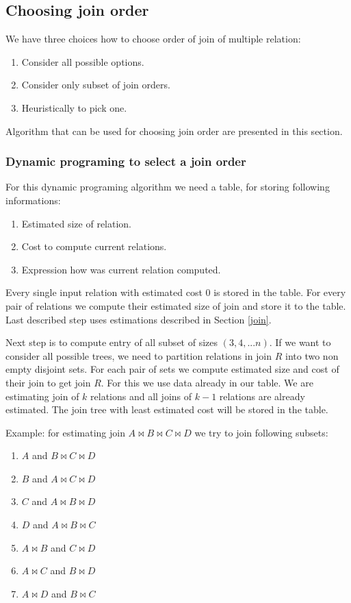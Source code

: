 \subsection{Choosing join order}
\label{joinOrder}
 We have three choices how to choose order of join of multiple relation:
\begin{enumerate}
\item Consider all possible options.
\item Consider only subset of join orders.
\item Heuristically to pick one.
\end{enumerate}
 
Algorithm that can be used for choosing join order are presented in this section.
 
\subsubsection{Dynamic programing to select a join order}
\label{dymanicalgorithm}
For this dynamic programing algorithm we need a table, for storing following informations:
 
\begin{enumerate}
\item Estimated size of relation.
\item Cost to compute current relations.
\item Expression how was current relation computed.
\end{enumerate}

Every single input relation with estimated cost 0 is stored in the table. For every pair of relations we compute their estimated size of join and store it to the table. Last described step uses estimations described in Section \ref{join}.  

Next step is to compute entry of all subset of sizes $(3,4,...n)$.
If we want to consider all possible trees, we need to partition relations in join $R$ into two non empty disjoint sets. For each pair of sets we compute estimated size and cost of their join to get join $R$. For this we use data already in our table. We are estimating join of $k$ relations and all joins of $k-1$ relations are already estimated. The join tree with least estimated cost will be stored in the table.

Example: for estimating join $A\Join B\Join C\Join D$ we try to join following subsets:
\begin{enumerate}
\item $A$ and $B\Join C\Join D$
\item $B$ and $A\Join C\Join D$
\item $C$ and $A\Join B\Join D$
\item $D$ and $A\Join B\Join C$
\item $A\Join B$ and $C\Join D$
\item $A\Join C$ and $B\Join D$
\item $A\Join D$ and $B\Join C$

\end{enumerate}

